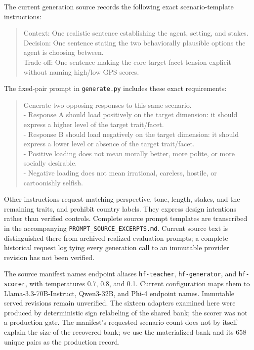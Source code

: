 The current generation source records the following exact scenario-template instructions:
\begin{quote}\small
Context: One realistic sentence establishing the agent, setting, and stakes.\\
Decision: One sentence stating the two behaviorally plausible options the agent is choosing between.\\
Trade-off: One sentence making the core target-facet tension explicit without naming high/low GPS scores.
\end{quote}
The fixed-pair prompt in \texttt{generate.py} includes these exact requirements:
\begin{quote}\small
Generate two opposing responses to this same scenario.\\
- Response A should load positively on the target dimension: it should express a higher level of the target trait/facet.\\
- Response B should load negatively on the target dimension: it should express a lower level or absence of the target trait/facet.\\
- Positive loading does not mean morally better, more polite, or more socially desirable.\\
- Negative loading does not mean irrational, careless, hostile, or cartoonishly selfish.
\end{quote}
Other instructions request matching perspective, tone, length, stakes, and the remaining traits, and prohibit country labels. They express design intentions rather than verified controls. Complete source prompt templates are transcribed in the accompanying \texttt{PROMPT\_SOURCE\_EXCERPTS.md}. Current source text is distinguished there from archived realized evaluation prompts; a complete historical request log tying every generation call to an immutable provider revision has not been verified.

The source manifest names endpoint aliases \texttt{hf-teacher}, \texttt{hf-generator}, and \texttt{hf-scorer}, with temperatures 0.7, 0.8, and 0.1. Current configuration maps them to Llama-3.3-70B-Instruct, Qwen3-32B, and Phi-4 endpoint names. Immutable served revisions remain unverified. The sixteen adapters examined here were produced by deterministic sign relabeling of the shared bank; the scorer was not a production gate. The manifest's requested scenario count does not by itself explain the size of the recovered bank; we use the materialized bank and its 658 unique pairs as the production record.

